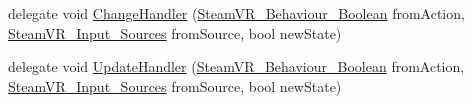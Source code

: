 \begin{DoxyCompactItemize}
\item 
delegate void \mbox{\hyperlink{class_valve_1_1_v_r_1_1_steam_v_r___behaviour___boolean_ac6747cdeceec4d24ddb39b4de05b1ca6}{Change\+Handler}} (\mbox{\hyperlink{class_valve_1_1_v_r_1_1_steam_v_r___behaviour___boolean}{Steam\+V\+R\+\_\+\+Behaviour\+\_\+\+Boolean}} from\+Action, \mbox{\hyperlink{namespace_valve_1_1_v_r_a82e5bf501cc3aa155444ee3f0662853f}{Steam\+V\+R\+\_\+\+Input\+\_\+\+Sources}} from\+Source, bool new\+State)
\item 
delegate void \mbox{\hyperlink{class_valve_1_1_v_r_1_1_steam_v_r___behaviour___boolean_ae98c73afb05e760178c435aa4baa175c}{Update\+Handler}} (\mbox{\hyperlink{class_valve_1_1_v_r_1_1_steam_v_r___behaviour___boolean}{Steam\+V\+R\+\_\+\+Behaviour\+\_\+\+Boolean}} from\+Action, \mbox{\hyperlink{namespace_valve_1_1_v_r_a82e5bf501cc3aa155444ee3f0662853f}{Steam\+V\+R\+\_\+\+Input\+\_\+\+Sources}} from\+Source, bool new\+State)
\end{DoxyCompactItemize}
